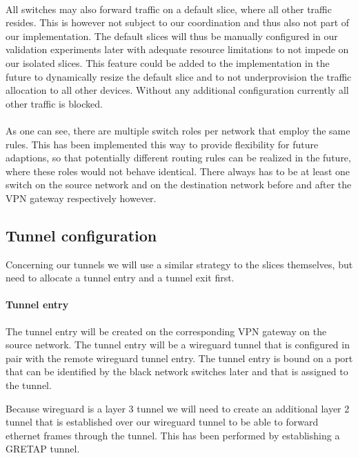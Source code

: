 \paragraph{} All switches may also forward traffic on a default slice, where all other traffic resides. This is however not subject to our coordination and thus also not part of our implementation. The default slices will thus be manually configured in our validation experiments later with adequate resource limitations to not impede on our isolated slices. This feature could be added to the implementation in the future to dynamically resize the default slice and to not underprovision the traffic allocation to all other devices. Without any additional configuration currently all other traffic is blocked.

\paragraph{} As one can see, there are multiple switch roles per network that employ the same rules. This has been implemented this way to provide flexibility for future adaptions, so that potentially different routing rules can be realized in the future, where these roles would not behave identical. There always has to be at least one switch on the source network and on the destination network before and after the VPN gateway respectively however.

\subsection{Tunnel configuration}
\label{impl_tunnel_config}
Concerning our tunnels we will use a similar strategy to the slices themselves, but need to allocate a tunnel entry and a tunnel exit first.

\paragraph{Tunnel entry} The tunnel entry will be created on the corresponding VPN gateway on the source network. The tunnel entry will be a wireguard tunnel that is configured in pair with the remote wireguard tunnel entry. The tunnel entry is bound on a port that can be identified by the black network switches later and that is assigned to the tunnel.

Because wireguard is a layer 3 tunnel we will need to create an additional layer 2 tunnel that is established over our wireguard tunnel to be able to forward ethernet frames through the tunnel. This has been performed by establishing a GRETAP tunnel.

